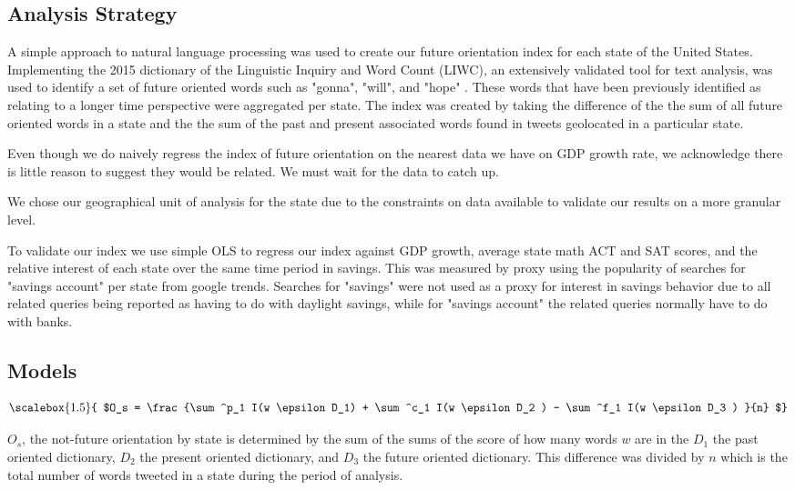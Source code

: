 \documentclass{article}
\begin{document}
\subsection{Analysis Strategy}
A simple approach to natural language processing was used to create our future orientation index for each state of the United States. Implementing the 2015 dictionary of the Linguistic Inquiry and Word Count (LIWC), an extensively validated tool for text analysis, was used to identify a set of future oriented words such as "gonna", "will", and "hope" \cite{pennebaker2015development}. These words that have been previously identified as relating to a longer time perspective were aggregated per state. The index was created by taking the difference of the the sum of all future oriented words in a state and the the sum of the past and present associated words found in tweets geolocated in a particular state. 

Even though we do naively regress the index of future orientation on the nearest data we have on GDP growth rate, we acknowledge there is little reason to suggest they would be related. We must wait for the data to catch up. 

We chose our geographical unit of analysis for the state due to the constraints on data available to validate our results on a more granular level.

To validate our index we use simple OLS to regress our index against GDP growth, average state math ACT and SAT scores, and the relative interest of each state over the same time period in savings. This was measured by proxy using the popularity of searches for "savings account" per state from google trends. Searches for "savings" were not used as a proxy for interest in savings behavior due to all related queries being reported as having to do with daylight savings, while for "savings account" the related queries normally have to do with banks. 

\subsection{Models}

\[ \scalebox{1.5}{ $O_s = \frac{\sum^p_1 I(w \epsilon D_1) + \sum^c_1 I(w \epsilon D_2 ) - \sum^f_1 I(w \epsilon D_3 ) }{n}  $} \]

$O_s$, the not-future orientation by state is determined by the sum of the sums of the score of how many words $w$ are in the $D_1$ the past oriented dictionary, $D_2$ the present oriented dictionary, and $D_3$ the future oriented dictionary. 
This difference was divided by $n$ which is the total number of words tweeted in a state during the period of analysis. 
\end{document}

